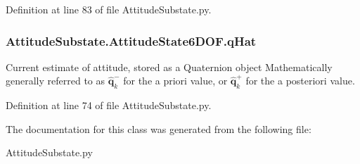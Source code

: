 Definition at line 83 of file Attitude\+Substate.\+py.

\subsubsection[{\texorpdfstring{q\+Hat}{qHat}}]{\setlength{\rightskip}{0pt plus 5cm}Attitude\+Substate.\+Attitude\+State6\+D\+O\+F.\+q\+Hat}\hypertarget{classAttitudeSubstate_1_1AttitudeState6DOF_a36a58a47280151dd544762d9a1d5c35d}{}\label{classAttitudeSubstate_1_1AttitudeState6DOF_a36a58a47280151dd544762d9a1d5c35d}


Current estimate of attitude, stored as a Quaternion object Mathematically generally referred to as $\mathbf{\hat{q}}^{-}_{k}$ for the a priori value, or $\mathbf{\hat{q}}^{+}_{k}$ for the a posteriori value. 



Definition at line 74 of file Attitude\+Substate.\+py.



The documentation for this class was generated from the following file\+:\begin{DoxyCompactItemize}
\item 
Attitude\+Substate.\+py\end{DoxyCompactItemize}
